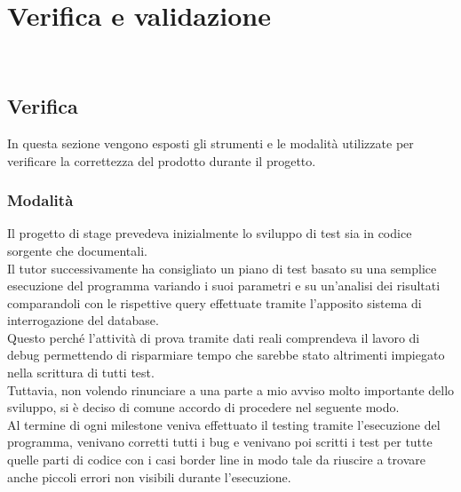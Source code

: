 
\chapter{Verifica e validazione}
\label{cap:verifica-validazione}

\noindent {}\\

\section{Verifica}
\noindent In questa sezione vengono esposti gli strumenti e le modalità utilizzate
per verificare la correttezza del prodotto durante il progetto.

\subsection{Modalità}
\noindent Il progetto di stage prevedeva inizialmente lo sviluppo di test sia in codice
sorgente che documentali.\\

\noindent Il tutor successivamente ha consigliato un piano di test basato su una semplice
esecuzione del programma variando i suoi parametri e su un'analisi
dei risultati comparandoli con le rispettive query effettuate tramite
l'apposito sistema di interrogazione del database.\\
Questo perché l’attività di prova tramite dati reali comprendeva il lavoro
di debug permettendo di risparmiare tempo che sarebbe stato altrimenti
impiegato nella scrittura di tutti test.\\

\noindent Tuttavia, non volendo rinunciare a una parte a mio avviso molto importante dello
sviluppo, si è deciso di comune accordo di procedere nel seguente modo.\\
Al termine di ogni milestone veniva effettuato il testing tramite l'esecuzione del
programma, venivano corretti tutti i bug e venivano poi scritti i test per tutte
quelle parti di codice con i casi border line in modo tale da riuscire a trovare anche
piccoli errori non visibili durante l'esecuzione.\\

